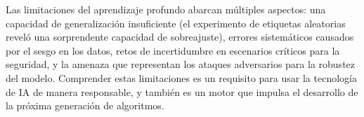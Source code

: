 Las limitaciones del aprendizaje profundo abarcan múltiples aspectos: una capacidad de generalización insuficiente (el experimento de etiquetas aleatorias reveló una sorprendente capacidad de sobreajuste), errores sistemáticos causados por el sesgo en los datos, retos de incertidumbre en escenarios críticos para la seguridad, y la amenaza que representan los ataques adversarios para la robustez del modelo. Comprender estas limitaciones es un requisito para usar la tecnología de IA de manera responsable, y también es un motor que impulsa el desarrollo de la próxima generación de algoritmos.

